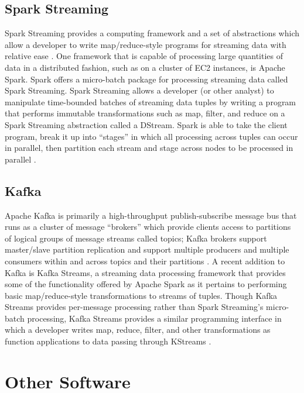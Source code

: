 \documentclass{thesis}
\begin{document}
    \subsection{Spark Streaming}
        Spark Streaming provides a computing framework and a set of abstractions which allow
        a developer to write map/reduce-style programs for streaming data with relative ease \cite{spark:streaming}.
        One framework that is capable of processing large quantities of data in a distributed fashion,
        such as on a cluster of EC2 instances, is Apache Spark. Spark offers a micro-batch package for
        processing streaming data called Spark Streaming. Spark Streaming allows a developer (or other
        analyst) to manipulate time-bounded batches of streaming data tuples by writing a program that
        performs immutable transformations such as map, filter, and reduce on a Spark Streaming abstraction
        called a DStream. Spark is able to take the client program, break it up into ``stages'' in which
        all processing across tuples can occur in parallel, then partition each stream and stage
        across nodes to be processed in parallel %
        \cite{spark:streaming}.
    \subsection{Kafka}
        Apache Kafka is primarily a high-throughput publish-subscribe message bus that runs as a cluster
        of message ``brokers'' which provide clients access to partitions of logical groups of message streams
        called topics; Kafka brokers support master/slave partition replication and support multiple
        producers and multiple consumers within and across topics and their partitions \cite{kafka}.
        A recent addition to Kafka is Kafka Streams, a streaming data processing framework that
        provides some of the functionality offered by Apache Spark as it pertains to performing basic
        map/reduce-style transformations to streams of tuples. Though Kafka Streams provides per-message
        processing rather than Spark Streaming's micro-batch processing, Kafka Streams provides a similar
        programming interface in which a developer writes map, reduce, filter, and other
        transformations as function applications to data passing through KStreams \cite{kafka:streams}.
    \section{Other Software}
\end{document}
